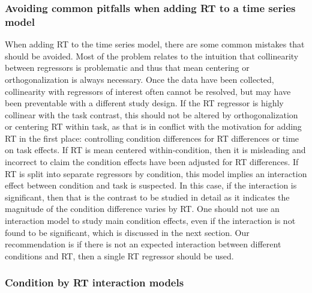 \documentclass[titlepage,12pt] {article}
\begin{document}
\subsubsection*{Avoiding common pitfalls when adding RT to a time series model}
When adding RT to the time series model, there are some  common mistakes that should be avoided.  Most of the problem relates to the intuition that collinearity between regressors is problematic and thus that mean centering or orthogonalization is always necessary.  Once the data have been collected, collinearity with regressors of interest often cannot be resolved, but may have been preventable with a different study design.  If the RT regressor is highly collinear with the task contrast, this should not be altered by orthogonalization or centering RT within task, as that is in conflict with the motivation for adding RT in the first place: controlling condition differences for RT differences or time on task effects.  If RT is mean centered within-condition, then it is misleading and incorrect to claim the condition effects have been adjusted for RT differences.  If RT is split into separate regressors by condition, this model implies an interaction effect between condition and task is suspected.  In this case, if the interaction is significant, then that is the contrast to be studied in detail as it indicates the magnitude of the condition difference varies by  RT.  One should not use an interaction model to study main condition effects, even if the interaction is not found to be significant, which is discussed in the next section.  Our recommendation is if there is not an expected interaction between different conditions and RT, then a single RT regressor should be used.  


\subsubsection*{Condition by RT interaction models}
\end{document}
